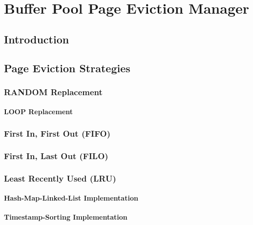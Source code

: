 \chapter[Buffer Pool Page Eviction Manager]{Buffer Pool Page Eviction Manager} \label{ch:page_evictioners}

\section{Introduction} \label{sec:page_evictioners_intro}

\section{Page Eviction Strategies} \label{sec:page_eviction_strategies}

\subsection[RANDOM]{RANDOM Replacement} \label{subsec:random}

\subsubsection[LOOP]{LOOP Replacement} \label{subsubsec:loop}

\subsection[FIFO]{First In, First Out (FIFO)} \label{subsec:fifo}

\subsection[FILO]{First In, Last Out (FILO)} \label{subsec:filo}

\subsection[LRU]{Least Recently Used (LRU)} \label{subsec:lru}

\subsubsection{Hash-Map-Linked-List Implementation} \label{subsubsec:lru_traditional}

\subsubsection{Timestamp-Sorting Implementation} \label{subsubsec:lru_timestamp}

